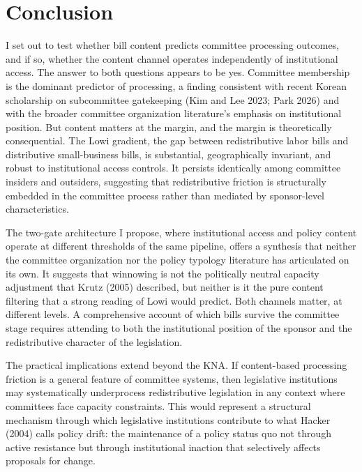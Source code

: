 \documentclass[11pt]{article}
\begin{document}
\section{Conclusion}

I set out to test whether bill content predicts committee processing outcomes, and if so, whether the content channel operates independently of institutional access. The answer to both questions appears to be yes. Committee membership is the dominant predictor of processing, a finding consistent with recent Korean scholarship on subcommittee gatekeeping (Kim and Lee 2023; Park 2026) and with the broader committee organization literature's emphasis on institutional position. But content matters at the margin, and the margin is theoretically consequential. The Lowi gradient, the gap between redistributive labor bills and distributive small-business bills, is substantial, geographically invariant, and robust to institutional access controls. It persists identically among committee insiders and outsiders, suggesting that redistributive friction is structurally embedded in the committee process rather than mediated by sponsor-level characteristics.

The two-gate architecture I propose, where institutional access and policy content operate at different thresholds of the same pipeline, offers a synthesis that neither the committee organization nor the policy typology literature has articulated on its own. It suggests that winnowing is not the politically neutral capacity adjustment that Krutz (2005) described, but neither is it the pure content filtering that a strong reading of Lowi would predict. Both channels matter, at different levels. A comprehensive account of which bills survive the committee stage requires attending to both the institutional position of the sponsor and the redistributive character of the legislation.

The practical implications extend beyond the KNA. If content-based processing friction is a general feature of committee systems, then legislative institutions may systematically underprocess redistributive legislation in any context where committees face capacity constraints. This would represent a structural mechanism through which legislative institutions contribute to what Hacker (2004) calls policy drift: the maintenance of a policy status quo not through active resistance but through institutional inaction that selectively affects proposals for change.
\end{document}
